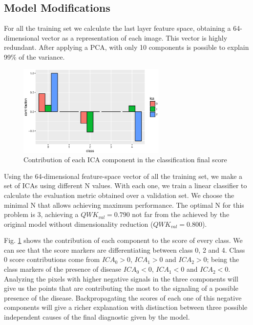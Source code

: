 \documentclass{llncs}
\begin{document}
\subsection{Model Modifications}

For all the training set we calculate the last layer feature space, obtaining a 64-dimensional vector as a representation of each image. This vector is highly redundant. After applying a PCA, with only 10 components is possible to explain 99\% of the variance.

\begin{figure}[h]
	\centering	
		\includegraphics[width=0.65\textwidth]{./figures/ica_class_contribution.eps}
	\caption{Contribution of each ICA component in the classification final score}
	\label{fig:ica_contribution}
\end{figure}

Using the 64-dimensional feature-space vector of all the training set, we make a set of ICAs using different N values. With each one, we train a linear classifier to calculate the evaluation metric obtained over a validation set. We choose the minimal N that allows achieving maximum performance. The optimal N for this problem is $3$, achieving a $QWK_{val} = 0.790$ not far from the achieved by the original model without dimensionality reduction ($QWK_{val} = 0.800$).

Fig. \ref{fig:ica_contribution} shows the contribution of each component to the score of every class. We can see that the score markers are differentiating between class 0, 2 and 4.  Class 0 score contributions come from $ICA_0 > 0$, $ICA_1 > 0$ and $ICA_2 > 0$; being the class markers of the presence of disease $ICA_0 < 0$, $ICA_1 < 0$ and $ICA_2 < 0$. Analyzing the pixels with higher negative signals in the three components will give us the points that are contributing the most to the signaling of a possible presence of the disease. Backpropagating the scores of each one of this negative components will give a richer explanation with distinction between three possible independent causes of the final diagnostic given by the model.
\end{document}
